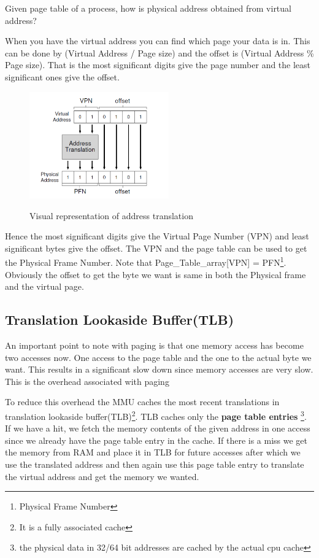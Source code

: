 \documentclass[12pt]{article}
\begin{document}
Given page table of a process, how is physical address obtained from virtual address?

When you have the virtual address you can find which page your data is in. This can be done by (Virtual Address / Page size) and the offset is (Virtual Address \% Page size).
That is the most significant digits give the page number and the least significant ones give the offset. 

\begin{figure}
    \begin{center}
        \includegraphics[width = 6cm]{address_translation.png}
        \label{figure:address_translation}
        \caption{Visual representation of address translation}
    \end{center}
\end{figure}


Hence the most significant digits give the Virtual Page Number (VPN) and least significant bytes give the offset. The VPN and the page
table can be used to get the Physical Frame Number. Note that Page\_Table\_array[VPN] = PFN\footnote{Physical Frame Number}. Obviously the offset to get the byte
we want is same in both the Physical frame and the virtual page.

\subsection*{Translation Lookaside Buffer(TLB)}
An important point to note with paging is that one memory access has become two accesses now. One access to the page table and the one to the actual byte we want. This results in a significant
slow down since memory accesses are very slow. This is the overhead associated with paging

To reduce this overhead the MMU caches the most recent translations in translation lookaside buffer(TLB)\footnote{It is a fully associated cache}.
TLB caches only the \textbf{page table entries} \footnote{the physical data in 32/64 bit addresses are cached by the actual cpu cache}. If we have
a hit, we fetch the memory contents of the given address in one access since we already have the page table entry in the cache. If there is a miss we get the memory from RAM and place it in TLB for future accesses after 
which we use the translated address and then again use this page table entry to translate the virtual address and get the memory we wanted.
\end{document}
